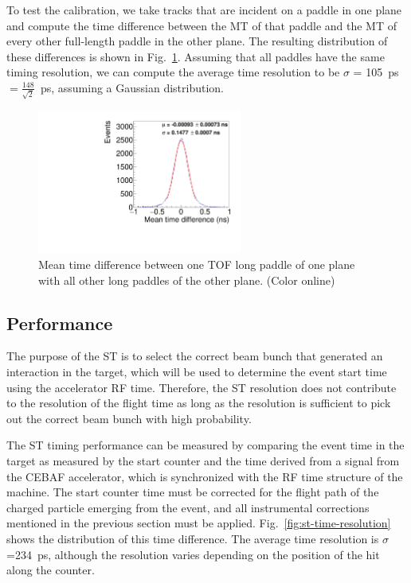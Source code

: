 To test the calibration, we take tracks that are incident on a paddle in one plane and compute the time difference between the MT of that paddle and the MT of every other full-length paddle in the other plane. The resulting distribution of these differences is shown in Fig.~\ref{fig:mt_diff}. Assuming that all paddles have the same timing resolution, we can compute the
average time resolution to be $\sigma$ = 105~ps$=\frac{148}{\sqrt{2}}$~ps, assuming a Gaussian distribution.
\begin{figure}[tbp]
\begin{center}
\includegraphics[width=0.6\textwidth]{figures/mt_diff_fullTOF.pdf}
\caption{\label{fig:mt_diff} Mean time difference between one TOF long paddle of one plane with all other long paddles
of the other plane. (Color online)}
\end{center}
\end{figure}

\subsection{Performance \label{sec:scperformance}}
The purpose of the ST is to select the correct beam bunch that generated an interaction in the target, which will be used to determine the event start time using the accelerator RF time. Therefore, the ST resolution does not contribute to the resolution of the flight time as long as the resolution is sufficient to pick out the correct beam bunch with high probability.

The ST timing performance can be measured by comparing the event time in the target as measured by the start counter and the time derived from a signal from the CEBAF accelerator, which is synchronized with the RF time structure of the machine. The start counter time must be corrected for the flight path of the charged particle emerging from the event, and all instrumental corrections mentioned in the previous section must be applied. Fig.~\ref{fig:st-time-resolution} shows the distribution of this time difference. The average time resolution is $\sigma$=234~ps, although the resolution varies depending on the position of the hit along the counter. 

